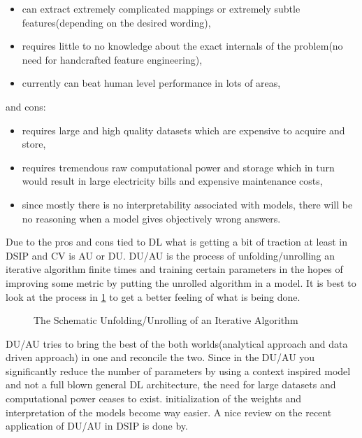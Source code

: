 \begin{itemize}
  \item can extract extremely complicated mappings or extremely subtle features(depending on the desired wording),
  \item requires little to no knowledge about the exact internals of the problem(no need for handcrafted feature engineering),
  \item currently can beat human level performance in lots of areas,
\end{itemize}

and cons:

\begin{itemize}
  \item requires large and high quality datasets\cite{Vision2021} which are expensive to acquire and store,
  \item requires tremendous raw computational power and storage which in turn would result in large electricity bills and expensive maintenance costs,
  \item since mostly there is no interpretability associated with models, there will be no reasoning when a model gives objectively wrong answers. 
\end{itemize}

Due to the pros and cons tied to \ac{DL} what is getting a bit of traction at least in \ac{DSIP} and \ac{CV} is \ac{AU} or \ac{DU}. 
\ac{DU}/\ac{AU} is the process of unfolding/unrolling an iterative algorithm finite times and training certain parameters in 
the hopes of improving some metric by putting the unrolled algorithm in a model. It is best to look at the process in \cref{fig:deep_unfolding_unrolling} 
to get a better feeling of what is being done. 
\begin{figure}
  \centering
	\captionsetup{justification=centering}
  \resizebox{35em}{10em}{}
  \caption{The Schematic Unfolding/Unrolling of an Iterative Algorithm}
  \label{fig:deep_unfolding_unrolling}
\end{figure}
\ac{DU}/\ac{AU} tries to bring the best of the both worlds(analytical approach and data driven approach) in one and reconcile the two. 
Since in the \ac{DU}/\ac{AU} you significantly reduce the number of parameters by using a context inspired model and not a full blown 
general \ac{DL} architecture, the need for large datasets and computational power ceases to exist. initialization of the weights 
and interpretation of the models become way easier. A nice review on the recent application of \ac{DU}/\ac{AU} in \ac{DSIP} is done by\cite{Monga2019}.


